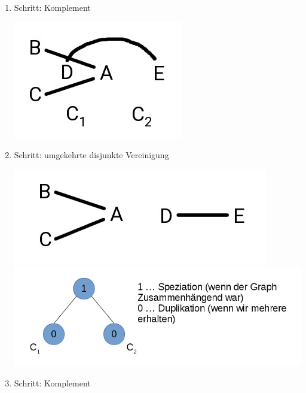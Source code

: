 \begin{enumerate}
	\item Schritt: Komplement \\
	\begin{center}
		\includegraphics[scale=0.5]{lectures/161202/pix/09.jpg}
	\end{center}
	\item Schritt: umgekehrte disjunkte Vereinigung \\
	\begin{center}
		\includegraphics[scale=0.5]{lectures/161202/pix/10.jpg}
		\includegraphics[scale=0.5]{lectures/161202/pix/11.jpg}
	\end{center}
	\item Schritt: Komplement
	\begin{center}

\end{center}
\end{enumerate}
